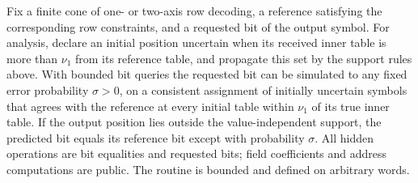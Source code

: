 \begin{lemma}
\label{ib:bit-simulation}
Fix a finite cone of one- or two-axis row decoding, a reference satisfying
the corresponding row constraints, and a requested bit of the output
symbol. For analysis, declare an initial position uncertain when its
received inner table is more than \(\nu_1\) from its reference table,
and propagate this set by the support rules above. With bounded bit
queries the requested bit can be simulated to any fixed error probability
\(\sigma>0\), on a consistent assignment of initially uncertain
symbols that agrees with the reference at every initial table
within \(\nu_1\) of its true inner table. If the output position lies
outside the value-independent support, the predicted bit equals its
reference bit except with probability \(\sigma\).  All hidden operations are bit equalities
and requested bits; field coefficients and address computations
are public.  The routine is bounded and defined on arbitrary words.
\end{lemma}

